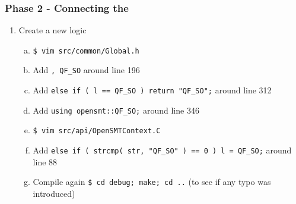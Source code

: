 \begin{frame}[fragile]
  \frametitle{Phase 2 - Connecting the \tsolver}

  \begin{enumerate}[1.]

    \item Create a new logic

      \begin{enumerate}[a.]

	\vfill

	\item \verb|$ vim src/common/Global.h|

	\vfill

	\item Add \verb|, QF_SO| around line 196

	\vfill

	\item Add \verb|else if ( l == QF_SO ) return "QF_SO";| 
	      around line 312

	\vfill

	\item Add \verb|using opensmt::QF_SO;| 
	      around line 346

	\vfill

	\item \verb|$ vim src/api/OpenSMTContext.C| 

	\vfill
	  
	\item Add \verb|else if ( strcmp( str, "QF_SO" ) == 0 ) l = QF_SO;|
	      around line 88

	\vfill
	  
	\item Compile again \verb|$ cd debug; make; cd ..| (to see
	      if any typo was introduced)

      \end{enumerate}

  \end{enumerate} 

\end{frame}

